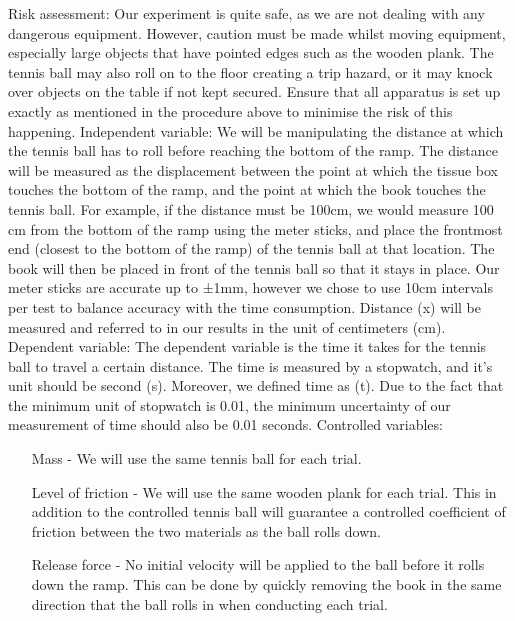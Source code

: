 \documentclass[12pt]{report}
\begin{document}
{\large {Risk assessment:}}\newline
Our experiment is quite safe, as we are not dealing with any dangerous equipment. However, caution must be made whilst moving equipment, especially large objects that have pointed edges such as the wooden plank. The tennis ball may also roll on to the floor creating a trip hazard, or it may knock over objects on the table if not kept secured. Ensure that all apparatus is set up exactly as mentioned in the procedure above to minimise the risk of this happening. \newline\newline
{\large {Independent variable:}}\newline
We will be manipulating the distance at which the tennis ball has to roll before reaching the bottom of the ramp. The distance will be measured as the displacement between the point at which the tissue box touches the bottom of the ramp, and the point at which the book touches the tennis ball. For example, if the distance must be 100cm, we would measure 100 cm from the bottom of the ramp using the meter sticks, and place the frontmost end (closest to the bottom of the ramp) of the tennis ball at that location. The book will then be placed in front of the tennis ball so that it stays in place. Our meter sticks are accurate up to ±1mm, however we chose to use 10cm intervals per test to balance accuracy with the time consumption. Distance (x) will be measured and referred to in our results in the unit of centimeters (cm).\newline \newline
{\large {Dependent variable:}}\newline
The dependent variable is the time it takes for the tennis ball to travel a certain distance. The time is measured by a stopwatch, and it’s unit should be second (s). Moreover, we defined time as (t). Due to the fact that the minimum unit of stopwatch is 0.01, the minimum uncertainty of our measurement of time should also be 0.01 seconds.\newline
{\large {Controlled variables:}}
\begin{enumerate}
    \item [Mass] - We will use the same tennis ball for each trial.
    \item [Level of friction] - We will use the same wooden plank for each trial. This in addition to the controlled tennis ball will guarantee a controlled coefficient of friction between the two materials as the ball rolls down.
    \item [Release force] - No initial velocity will be applied to the ball before it rolls down the ramp. This can be done by quickly removing the book in the same direction that the ball rolls in when conducting each trial.
\end{enumerate}
\end{document}
